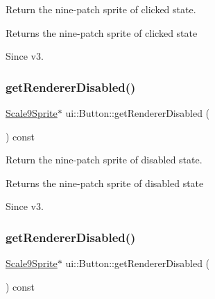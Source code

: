 Return the nine-\/patch sprite of clicked state. 

\begin{DoxyReturn}{Returns}
the nine-\/patch sprite of clicked state 
\end{DoxyReturn}
\begin{DoxySince}{Since}
v3. 
\end{DoxySince}
\mbox{\label{classui_1_1Button_acbc88b0f82871718e0f49bda5e4cf0ca}} 
\subsubsection{\texorpdfstring{get\+Renderer\+Disabled()}{getRendererDisabled()}\hspace{0.1cm}{\footnotesize\ttfamily [1/2]}}
{\footnotesize\ttfamily \hyperlink{classui_1_1Scale9Sprite}{Scale9\+Sprite}$\ast$ ui\+::\+Button\+::get\+Renderer\+Disabled (\begin{DoxyParamCaption}{ }\end{DoxyParamCaption}) const\hspace{0.3cm}{\ttfamily [inline]}}



Return the nine-\/patch sprite of disabled state. 

\begin{DoxyReturn}{Returns}
the nine-\/patch sprite of disabled state 
\end{DoxyReturn}
\begin{DoxySince}{Since}
v3. 
\end{DoxySince}
\mbox{\label{classui_1_1Button_acbc88b0f82871718e0f49bda5e4cf0ca}} 
\subsubsection{\texorpdfstring{get\+Renderer\+Disabled()}{getRendererDisabled()}\hspace{0.1cm}{\footnotesize\ttfamily [2/2]}}
{\footnotesize\ttfamily \hyperlink{classui_1_1Scale9Sprite}{Scale9\+Sprite}$\ast$ ui\+::\+Button\+::get\+Renderer\+Disabled (\begin{DoxyParamCaption}{ }\end{DoxyParamCaption}) const\hspace{0.3cm}{\ttfamily [inline]}}




